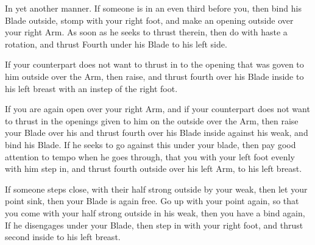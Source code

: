 In yet another manner. If someone is in an even third before you, then
bind his Blade outside, stomp with your right foot, and make an
opening outside over your right Arm. As soon as he seeks to thrust
therein, then do with haste a rotation, and thrust Fourth under his
Blade to his left side.

\exercise{}

If your counterpart does not want to thrust in to the opening that was
goven to him outside over the Arm, then raise, and
thrust fourth over his Blade inside to his left breast with an instep
of the right foot.

\exercise{}

If you are again open over your right Arm, and if your counterpart
does not want to thrust in the openings given to him on the outside
over the Arm, then raise your Blade over his and thrust
fourth over his Blade inside against his weak, and bind his Blade. If
he seeks to go against this under your blade, then pay good attention
to tempo when he goes through, that you with your left foot evenly
with him step in, and thrust fourth outside over his left Arm, to his
left breast.

\exercise{}

If someone steps close, with their half strong outside by your weak,
then let your point sink, then your Blade is again free. Go up with
your point again, so that you come with your half strong outside in
his weak, then you have a bind again, If he disengages under your
Blade, then step in with your right foot, and thrust second inside to
his left breast.
